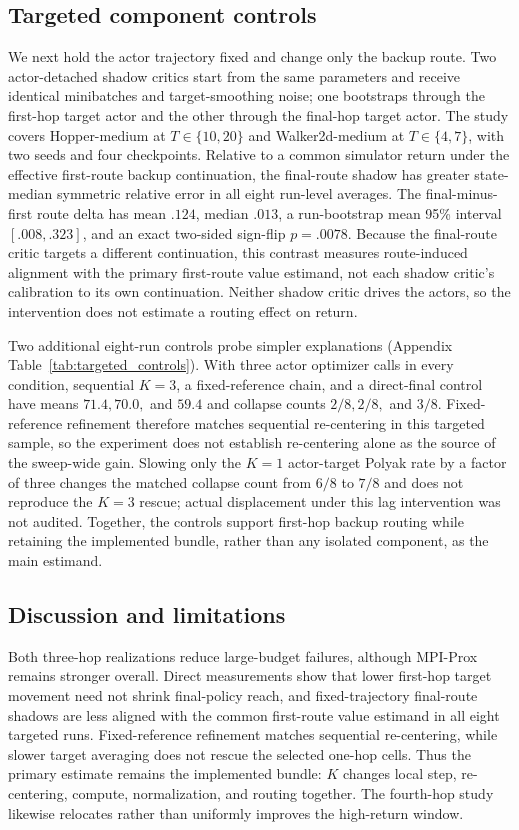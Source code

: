 \subsection{Targeted component controls}

We next hold the actor trajectory fixed and change only the backup route. Two actor-detached shadow critics start from the same parameters and receive identical minibatches and target-smoothing noise; one bootstraps through the first-hop target actor and the other through the final-hop target actor. The study covers Hopper-medium at $T\in\{10,20\}$ and Walker2d-medium at $T\in\{4,7\}$, with two seeds and four checkpoints. Relative to a common simulator return under the effective first-route backup continuation, the final-route shadow has greater state-median symmetric relative error in all eight run-level averages. The final-minus-first route delta has mean $.124$, median $.013$, a run-bootstrap mean 95\% interval $[.008,.323]$, and an exact two-sided sign-flip $p=.0078$. Because the final-route critic targets a different continuation, this contrast measures route-induced alignment with the primary first-route value estimand, not each shadow critic's calibration to its own continuation. Neither shadow critic drives the actors, so the intervention does not estimate a routing effect on return.

Two additional eight-run controls probe simpler explanations (Appendix Table~\ref{tab:targeted_controls}). With three actor optimizer calls in every condition, sequential $K=3$, a fixed-reference chain, and a direct-final control have means $71.4,70.0,$ and $59.4$ and collapse counts $2/8,2/8,$ and $3/8$. Fixed-reference refinement therefore matches sequential re-centering in this targeted sample, so the experiment does not establish re-centering alone as the source of the sweep-wide gain. Slowing only the $K=1$ actor-target Polyak rate by a factor of three changes the matched collapse count from $6/8$ to $7/8$ and does not reproduce the $K=3$ rescue; actual displacement under this lag intervention was not audited. Together, the controls support first-hop backup routing while retaining the implemented bundle, rather than any isolated component, as the main estimand.

\subsection{Discussion and limitations}

Both three-hop realizations reduce large-budget failures, although MPI-Prox remains stronger overall. Direct measurements show that lower first-hop target movement need not shrink final-policy reach, and fixed-trajectory final-route shadows are less aligned with the common first-route value estimand in all eight targeted runs. Fixed-reference refinement matches sequential re-centering, while slower target averaging does not rescue the selected one-hop cells. Thus the primary estimate remains the implemented bundle: $K$ changes local step, re-centering, compute, normalization, and routing together. The fourth-hop study likewise relocates rather than uniformly improves the high-return window.

